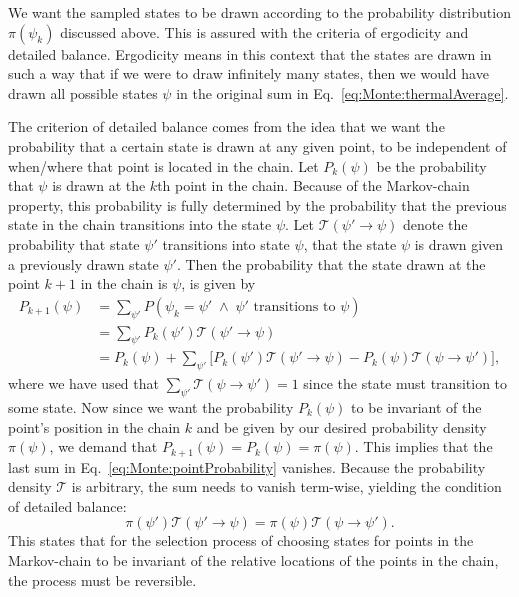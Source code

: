 We want the sampled states to be drawn according to the probability distribution $\pi(\psi_k)$ discussed above. This is assured
with the criteria of ergodicity and detailed balance. Ergodicity means in this context that the states are drawn in such a way
that if we were to draw infinitely many states, then we would have drawn all possible states $\psi$ in the original sum in
Eq.~\eqref{eq:Monte:thermalAverage}.

The criterion of detailed balance comes from the idea that we want the probability that
a certain state is drawn at any given point, to be independent of when/where that point is located in the chain. Let $P_k(\psi)$ be the probability
that $\psi$ is drawn at the $k$th point in the chain. Because of the Markov-chain property, this probability is fully determined
by the probability that the previous state in the chain transitions into the state $\psi$. Let $\mathcal{T}(\psi'\to\psi)$ denote
the probability that state $\psi'$ transitions into state $\psi$, \ie that the state $\psi$ is drawn given a previously drawn
state $\psi'$. Then the probability that the state drawn at the point $k+1$ in the chain is $\psi$, is given by
\begin{equation}
    \label{eq:Monte:pointProbability}
    \begin{split}
        P_{k+1}(\psi) &= \sum_{\psi'}P(\psi_k = \psi'\;\land\;\psi'\text{ transitions to }\psi)\\
        &= \sum_{\psi'}P_k(\psi')\mathcal{T}(\psi'\to\psi)\\
        &= P_k(\psi) + \sum_{\psi'}\Big[P_k(\psi')\mathcal{T}(\psi'\to\psi) - P_k(\psi)\mathcal{T}(\psi\to\psi')\Big],
    \end{split}
\end{equation}
where we have used that $\sum_{\psi'}\mathcal{T}(\psi\to\psi') = 1$ since the state must transition to some state. Now since
we want the probability $P_k(\psi)$ to be invariant of the point's position in the chain $k$ and be given by our desired probability density $\pi(\psi)$,
we demand that $P_{k+1}(\psi) = P_k(\psi) = \pi(\psi)$. This implies that the last sum in Eq.~\eqref{eq:Monte:pointProbability} vanishes.
Because the probability density $\mathcal{T}$ is arbitrary, the sum needs to vanish term-wise, yielding the condition
of detailed balance:
\begin{equation}
    \label{eq:Monte:detailedBalance}
    \pi(\psi')\mathcal{T}(\psi'\to\psi) = \pi(\psi)\mathcal{T}(\psi\to\psi').
\end{equation}
This states that for the selection process of choosing states for points in the Markov-chain to be invariant of the relative locations of the points in the
chain, the process must be reversible.

